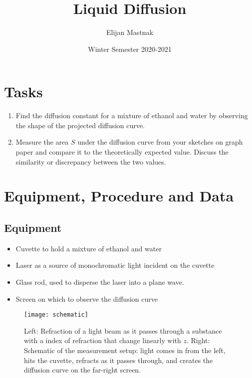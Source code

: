 \documentclass[11pt, a4paper]{article}
\begin{document}
\title{Liquid Diffusion}
\author{Elijan Mastnak}
\date{Winter Semester 2020-2021}
\maketitle
\tableofcontents
		

\section{Tasks}
\begin{enumerate}
	\item Find the diffusion constant for a mixture of ethanol and water by observing the shape of the projected diffusion curve.
	
	\item Measure the area $ S $ under the diffusion curve from your sketches on graph paper and compare it to the theoretically expected value. Discuss the similarity or discrepancy between the two values. 

\end{enumerate}

\section{Equipment, Procedure and Data}

\subsection{Equipment}
\begin{itemize}

	\item Cuvette to hold a mixture of ethanol and water
	
	\item Laser as a source of monochromatic light incident on the cuvette
	
	\item Glass rod, used to disperse the laser into a plane wave.
	
	\item Screen on which to observe the diffusion curve
\end{itemize}

\begin{figure}[htb!]
\texttt{[image: schematic]}
\caption{Left: Refraction of a light beam as it passes through a substance with a index of refraction that change linearly with $ z $. Right: Schematic of the measurement setup: light comes in from the left, hits the cuvette, refracts as it passes through, and creates the diffusion curve on the far-right screen.}
\label{diftek:fig:schematic}
\end{figure}
\end{document}
